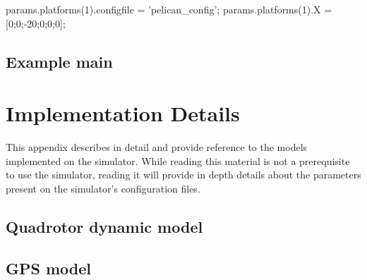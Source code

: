 \documentclass[a4paper,11pt]{report}
\begin{document}
params.platforms(1).configfile = 'pelican_config';
params.platforms(1).X = [0;0;-20;0;0;0];


\section{Example main}



\appendix
\chapter{Implementation Details}

This appendix describes in detail and provide reference to the models implemented on the simulator.
While reading this material is not a prerequisite to use the simulator, reading it will provide in depth details about the parameters present on the simulator's configuration files.

\section{Quadrotor dynamic model}


\section{GPS model}
\end{document}
